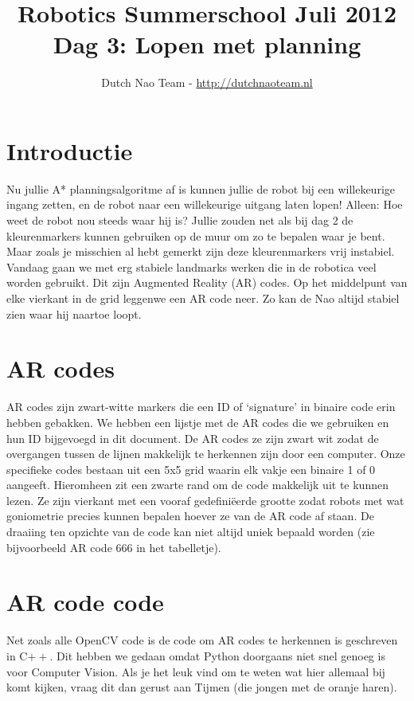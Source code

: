 \documentclass[a4paper]{article}
\title{\textbf{Robotics Summerschool Juli 2012} \\ Dag 3: Lopen met planning }
\author{Dutch Nao Team - \url{http://dutchnaoteam.nl}}
\date{}
\begin{document}
\maketitle

\section{Introductie}

Nu jullie A* planningsalgoritme af is kunnen jullie de robot bij een willekeurige ingang zetten, en de robot naar een willekeurige uitgang laten lopen! Alleen: Hoe weet de robot nou steeds waar hij is? Jullie zouden net als bij dag 2 de kleurenmarkers kunnen gebruiken op de muur om zo te bepalen waar je bent. Maar zoals je misschien al hebt gemerkt zijn deze kleurenmarkers vrij instabiel. Vandaag gaan we met erg stabiele landmarks werken die in de robotica veel worden gebruikt. Dit zijn Augmented Reality (AR) codes. Op het middelpunt van elke vierkant in de grid leggenwe een AR code neer. Zo kan de Nao altijd stabiel zien waar hij naartoe loopt.

\tableofcontents

\newpage

\section{AR codes}
AR codes zijn zwart-witte markers die een ID of `signature' in binaire code erin hebben gebakken. We hebben een lijstje met de AR codes die we gebruiken en hun ID bijgevoegd in dit document. De AR codes ze zijn zwart wit zodat de overgangen tussen de lijnen makkelijk te herkennen zijn door een computer. Onze specifieke codes bestaan uit een 5x5 grid waarin elk vakje een binaire 1 of 0 aangeeft. Hieromheen zit een zwarte rand om de code makkelijk uit te kunnen lezen. Ze zijn vierkant met een vooraf gedefiniëerde grootte zodat robots met wat goniometrie precies kunnen bepalen hoever ze van de AR code af staan. De draaiing ten opzichte van de code kan niet altijd uniek bepaald worden (zie bijvoorbeeld AR code 666 in het tabelletje).

\section{AR code code}
Net zoals alle OpenCV code is de code om AR codes te herkennen is geschreven in C$ \stackrel{}{++}$. Dit hebben we gedaan omdat Python doorgaans niet snel genoeg is voor Computer Vision. Als je het leuk vind om te weten wat hier allemaal bij komt kijken, vraag dit dan gerust aan Tijmen (die jongen met de oranje haren).
\end{document}
